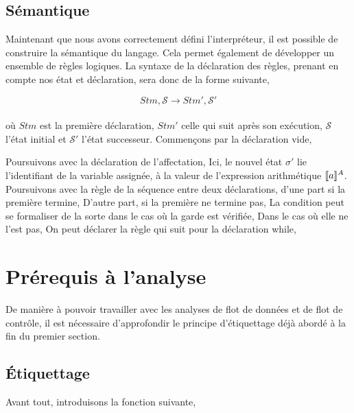 \documentclass[a4paper, 12pt]{article}
\begin{document}
\subsection{Sémantique}
Maintenant que nous avons correctement défini l'interpréteur, il est possible 
de construire la sémantique du langage. Cela permet également de développer 
un ensemble de règles logiques. La syntaxe de la déclaration des règles,
prenant en compte nos état et déclaration, sera donc de la forme suivante,

\[Stm, \mathcal{S} \longrightarrow Stm', \mathcal{S}'\]
\\
où $Stm$ est la première déclaration, $Stm'$ celle qui suit après son exécution, 
$\mathcal{S}$ l'état initial et $\mathcal{S}'$  l'état successeur. Commençons 
par la déclaration vide,

\srule{ }{\semanticd{\sskip}{\sigma}{\emptyset}{\sigma}}

Poursuivons avec la déclaration de l'affectation,
Ici, le nouvel état $\sigma'$ lie l'identifiant de la variable assignée, à la 
valeur de l'expression arithmétique $[\![{a}]\!]^{A}$. Poursuivons avec la règle 
de la séquence entre deux déclarations, d'une part si la première termine,
{}
D'autre part, si la première ne termine pas,
{}
La condition peut se formaliser de la sorte dans le cas où la garde est vérifiée,
{}
Dans le cas où elle ne l'est pas,
{}
On peut déclarer la règle qui suit pour la déclaration while,
{}

\section{Prérequis à l'analyse}
De manière à pouvoir travailler avec les analyses de flot de données et de flot de contrôle, 
il est nécessaire d'approfondir le principe d'étiquettage déjà abordé à la fin du premier section.

\subsection{Étiquettage}
Avant tout, introduisons la fonction suivante,
\end{document}
